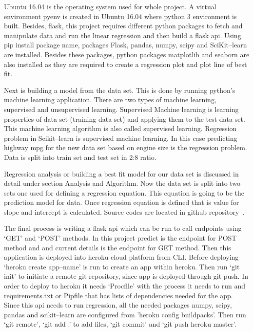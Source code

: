   Ubuntu 16.04 is the operating system used for whole project.
 A virtual environment pyenv is created in Ubuntu 16.04 where python 3
 environment is built. Besides, flask, this project requires different python
 packages to fetch and manipulate data and run the linear regression and
 then build a flask api. Using pip install package name, packages Flask,
 pandas, numpy, scipy and SciKit--learn are installed. Besides these
 packages, python packages matplotlib and seaborn are also installed as they
 are required to create a regression plot and plot line of best fit. 
 
 Next is building a model from the data set. This is done by
 running python's machine learning application. There are two types of
 machine learning, supervised and unsupervised learning. Supervised
 Machine learning is learning properties of data set (training data set)
 and applying them to the test data set. This machine learning algorithm
 is also called supervised learning. Regression problem in Scikit--learn
 is supervised machine learning. In this case predicting highway mpg for
 the new data set based on engine size is the regression problem. Data
 is split into train set and test set in 2:8 ratio.
    
   Regression analysis or building a best fit model for our data set is
   discussed in detail under section Analysis and Algorithm. Now the data
   set is split into two sets one used for defining a regression 
   equation. This equation is going to be the prediction model for data.
   Once regression equation is defined
   that is value for slope and intercept is calculated.   
   Source codes are located in github repository~\cite{hid-sp18-415-regression}.
   
 The final process is writing a flask api which can be run to call 
 endpoints using `GET' and `POST' methods. In this project predict is the
 endpoint for POST method and and current details is the endpoint for GET
 method. Then this application is deployed into heroku cloud platform from
 CLI. Before deploying `heroku create app--name' is run to create an app within
 heroku. Then run `git init' to initiate a remote git repository, since app is 
 deployed through git push. In order to deploy to heroku it needs `Procfile'
 with the process it needs to run and requirements.txt or Pipfile that has lists 
 of dependencies needed for the app. Since this api needs to run regression, all
 the needed packages numpy, scipy, pandas and scikit--learn are configured from 
 'heroku config buildpacks'. Then run `git remote', `git add .' to add files,  
 `git commit' and `git push heroku master'.
    

